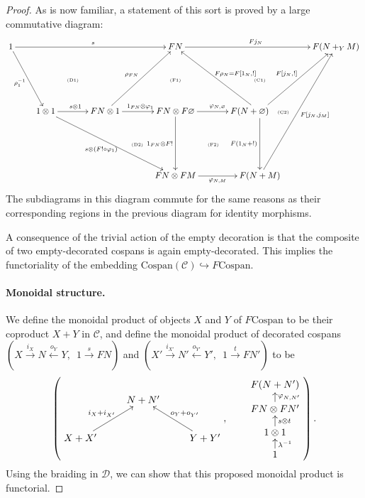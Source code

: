 \begin{proof}
As is now familiar, a statement of this sort is proved by a large commutative
diagram:
\[
  \xymatrixcolsep{.63pc}
  \xymatrix{
    1 \ar[rrrrrr]^s \ar[ddrr]_{\rho_1^{-1}} &&&&&& FN \ar[rrrr]^{Fj_N} &&&& F(N+_YM) \\
    &&& \textrm{\tiny(D1)} &&& \textrm{\tiny(F1)} && \textrm{\tiny(C1)} \\
    && 1 \otimes 1 \ar[rr]^{s\otimes 1} \ar[ddrrrr]_{s \otimes (F! \circ
    \varphi_1)} && FN \otimes 1 \ar[uurr]^{\rho_{FN}} \ar[rr]^{1_{FN}
  \otimes \varphi_1}
    && FN \otimes F\varnothing \ar[rr]^{\varphi_{N,\varnothing}} \ar[dd]_{1_{FN}
  \otimes F!} && F(N+\varnothing) \ar[uull]_{F\rho_N=F[1_N,!]}
  \ar[uurr]^{F[j_N,!]}
      \ar[dd]_{F(1_N+!)} \quad \textrm{\tiny(C2)}\\
      &&&&& \textrm{\tiny(D2)} && \textrm{\tiny(F2)}\\
      &&&&&& FN \otimes FM \ar[rr]_{\varphi_{N,M}} && F(N+M)
      \ar[uuuurr]_{F[j_N,j_M]}
  }
\]
The subdiagrams in this diagram commute for the same reasons as their
corresponding regions in the previous diagram for identity morphisms. 

A consequence of the trivial action of the empty decoration is that the
composite of two empty-decorated cospans is again empty-decorated. This implies
the functoriality of the embedding $\mathrm{Cospan(\mathcal{C})} \hookrightarrow
F\mathrm{Cospan}$.

\paragraph{Monoidal structure.} 

  We define the monoidal product of objects $X$ and $Y$ of $F\mathrm{Cospan}$ to
  be their coproduct $X+Y$ in $\mathcal C$, and define the monoidal product of
  decorated cospans $(X \stackrel{i_X}\longrightarrow N
  \stackrel{o_Y}\longleftarrow Y,\enspace 1 \stackrel{s}\longrightarrow FN)$ and
  $(X' \stackrel{i_{X'}}\longrightarrow N' \stackrel{o_{Y'}}\longleftarrow
  Y',\enspace 1 \stackrel{t}\longrightarrow FN')$ to be 
  \[
    \left(
    \begin{aligned}
      \xymatrix{
	& N+N' \\  
	X+X' \ar[ur]^{i_X+i_{X'}} && Y+Y' \ar[ul]_{o_Y+o_{Y'}}
      }
    \end{aligned}
    ,
    \qquad
    \begin{aligned}
      \xymatrixrowsep{.8pc}
      \xymatrix{
	F(N+N') \\
	FN \otimes FN' \ar[u]_{\varphi_{N,N'}}\\
	1 \otimes 1 \ar[u]_{s \otimes t} \\
	1 \ar[u]_{\lambda^{-1}}
      }
    \end{aligned}
    \right).
  \]
  Using the braiding in $\mathcal D$, we can show that this proposed monoidal
  product is functorial. 
 

\end{proof}
